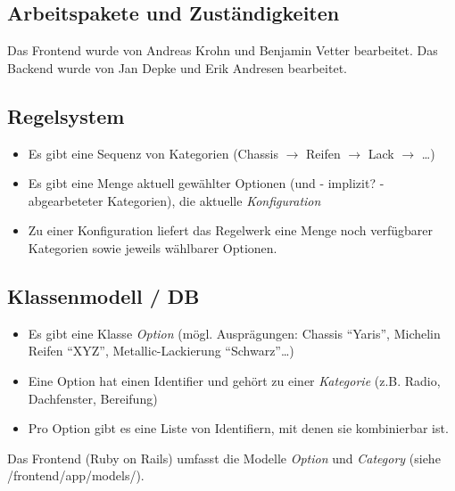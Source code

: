 \documentclass[a4paper,10pt]{article}
\begin{document}
\subsection*{Arbeitspakete und Zuständigkeiten}

Das Frontend wurde von Andreas Krohn und Benjamin Vetter bearbeitet.
Das Backend wurde von Jan Depke und Erik Andresen bearbeitet.
 
\subsection*{Regelsystem}

\begin{itemize}
 \item Es gibt eine Sequenz von Kategorien (Chassis $\rightarrow$ Reifen $\rightarrow$ Lack $\rightarrow$ \ldots)
 \item Es gibt eine Menge aktuell gewählter Optionen (und - implizit? - abgearbeteter Kategorien), die aktuelle \emph{Konfiguration}
 \item Zu einer Konfiguration liefert das Regelwerk eine Menge noch verfügbarer Kategorien sowie jeweils wählbarer Optionen.
\end{itemize}

\subsection*{Klassenmodell / DB}

\begin{itemize}
 \item Es gibt eine Klasse \emph{Option} (mögl. Ausprägungen: Chassis "`Yaris"', Michelin Reifen "`XYZ"', Metallic-Lackierung "`Schwarz"'\ldots)
 \item Eine Option hat einen Identifier und gehört zu einer \emph{Kategorie} (z.B. Radio, Dachfenster, Bereifung)
 \item Pro Option gibt es eine Liste von Identifiern, mit denen sie kombinierbar ist.
\end{itemize}

Das Frontend (Ruby on Rails) umfasst die Modelle \textit{Option} und \textit{Category} (siehe /frontend/app/models/).
\end{document}
